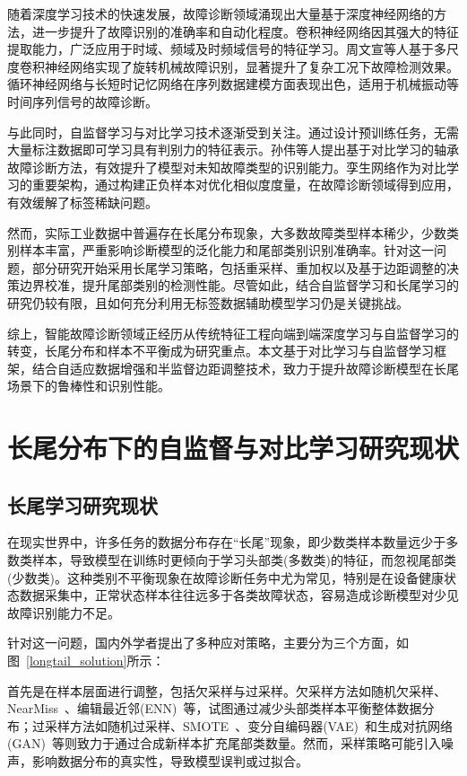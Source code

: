 \documentclass[master]{thesis-uestc}
\begin{document}
随着深度学习技术的快速发展，故障诊断领域涌现出大量基于深度神经网络的方法，进一步提升了故障识别的准确率和自动化程度。卷积神经网络因其强大的特征提取能力，广泛应用于时域、频域及时频域信号的特征学习。周文宣等人基于多尺度卷积神经网络实现了旋转机械故障识别，显著提升了复杂工况下故障检测效果。循环神经网络与长短时记忆网络在序列数据建模方面表现出色，适用于机械振动等时间序列信号的故障诊断。

与此同时，自监督学习与对比学习技术逐渐受到关注。通过设计预训练任务，无需大量标注数据即可学习具有判别力的特征表示。孙伟等人提出基于对比学习的轴承故障诊断方法，有效提升了模型对未知故障类型的识别能力。孪生网络作为对比学习的重要架构，通过构建正负样本对优化相似度度量，在故障诊断领域得到应用，有效缓解了标签稀缺问题。

然而，实际工业数据中普遍存在长尾分布现象，大多数故障类型样本稀少，少数类别样本丰富，严重影响诊断模型的泛化能力和尾部类别识别准确率。针对这一问题，部分研究开始采用长尾学习策略，包括重采样、重加权以及基于边距调整的决策边界校准，提升尾部类别的检测性能。尽管如此，结合自监督学习和长尾学习的研究仍较有限，且如何充分利用无标签数据辅助模型学习仍是关键挑战。

综上，智能故障诊断领域正经历从传统特征工程向端到端深度学习与自监督学习的转变，长尾分布和样本不平衡成为研究重点。本文基于对比学习与自监督学习框架，结合自适应数据增强和半监督边距调整技术，致力于提升故障诊断模型在长尾场景下的鲁棒性和识别性能。


\section{长尾分布下的自监督与对比学习研究现状}
\subsection{长尾学习研究现状}
在现实世界中，许多任务的数据分布存在“长尾”现象，即少数类样本数量远少于多数类样本，导致模型在训练时更倾向于学习头部类(多数类)的特征，而忽视尾部类(少数类)。这种类别不平衡现象在故障诊断任务中尤为常见，特别是在设备健康状态数据采集中，正常状态样本往往远多于各类故障状态，容易造成诊断模型对少见故障识别能力不足。

针对这一问题，国内外学者提出了多种应对策略，主要分为三个方面，如图~\ref{longtail_solution}所示：

首先是在样本层面进行调整，包括欠采样与过采样。欠采样方法如随机欠采样、NearMiss~、编辑最近邻(ENN)~等，试图通过减少头部类样本平衡整体数据分布；过采样方法如随机过采样、SMOTE~、变分自编码器(VAE)~和生成对抗网络(GAN)~等则致力于通过合成新样本扩充尾部类数量。然而，采样策略可能引入噪声，影响数据分布的真实性，导致模型误判或过拟合。
\end{document}
